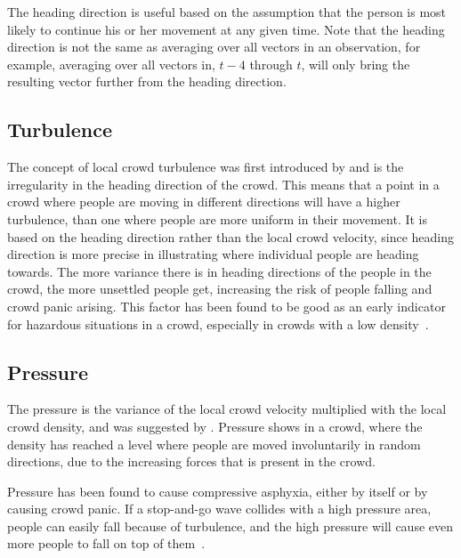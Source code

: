 The heading direction is useful based on the assumption that the person is most likely to continue his or her movement at any given time. Note that the heading direction is not the same as averaging over all vectors in an observation, for example, averaging over all vectors in, $t-4$ through $t$, will only bring the resulting vector further from the heading direction.

\subsection{Turbulence}
\label{sub:crowdFactorTurbulence}
The concept of local crowd turbulence was first introduced by \citet{videoanalysis} and is the irregularity in the heading direction of the crowd. This means that a point in a crowd where people are moving in different directions will have a higher turbulence, than one where people are more uniform in their movement. It is based on the heading direction rather than the local crowd velocity, since heading direction is more precise in illustrating where individual people are heading towards. The more variance there is in heading directions of the people in the crowd, the more unsettled people get, increasing the risk of people falling and crowd panic arising. This factor has been found to be good as an early indicator for hazardous situations in a crowd, especially in crowds with a low density~\cite{wirz2012inferring}.


\subsection{Pressure}
\label{subsec:crowdConditionsPressure}
The pressure is the variance of the local crowd velocity multiplied with the local crowd density, and was suggested by \citet{empircalstudy}. Pressure shows in a crowd, where the density has reached a level where people are moved involuntarily in random directions, due to the increasing forces that is present in the crowd.

Pressure has been found to cause compressive asphyxia, either by itself or by causing crowd panic. If a stop-and-go wave collides with a high pressure area, people can easily fall because of turbulence, and the high pressure will cause even more people to fall on top of them~\cite{videoanalysis}.

